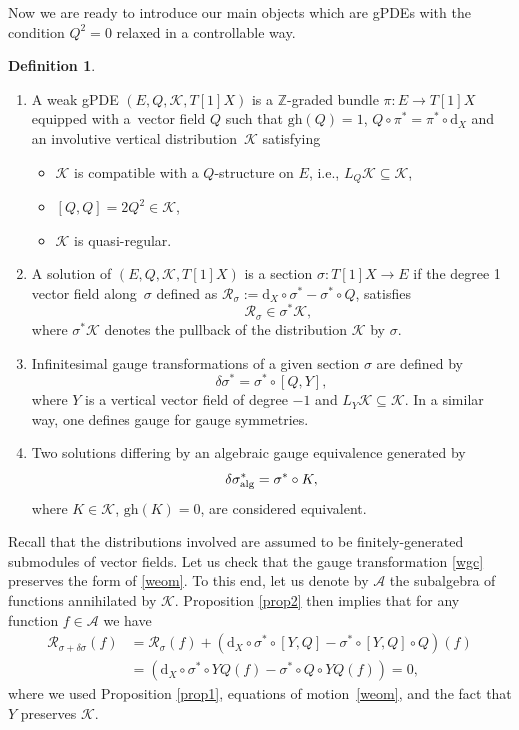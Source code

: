 \documentclass[10pt,a4paper]{amsart}
\numberwithin{equation}{section}
\theoremstyle{definition}
\newtheorem{Definition}[Theorem]{Definition}
\newcommand{\gh}[1]{\mathrm{gh}(#1)}
\newcommand{\dx}{\mathrm{d}_X}
\def\cK{\mathcal{K}}
\begin{document}
Now we are ready to introduce our main objects which are gPDEs with the condition $Q^2=0$ relaxed in a controllable way.
\begin{Definition}\label{def:WGPDE}
\quad
\begin{enumerate}\itemsep=0pt
 \item A weak gPDE $(E,Q,\cK,T[1]X)$ is a $\mathbb{Z}$-graded bundle $\pi\colon E\rightarrow T[1]X$ equipped with a~vector field $Q$ such that $\gh Q=1$, $Q\circ\pi^*=\pi^*\circ \dx$ and an involutive vertical distribution~$\mathcal{K}$ satisfying
 \begin{itemize}\itemsep=0pt
 \item $\mathcal{K}$ is compatible with a $Q$-structure on $E$, i.e., $L_Q \mathcal{K}\subseteq\mathcal{K}$,
 \item $[Q,Q]=2Q^2\in \mathcal{K}$,
 \item $\mathcal{K}$ is quasi-regular.
 \end{itemize}
\item A solution of $(E,Q,\cK,T[1]X)$ is a section $\sigma\colon T[1]X\rightarrow E$ if the degree 1 vector field along~$\sigma$ defined as $\mathcal{R}_{\sigma}:=\dx\circ \sigma^*-\sigma^*\circ Q$, satisfies
\begin{equation}\label{weom}
\quad \mathcal{R}_{\sigma}\in\sigma^*\mathcal{K},
\end{equation}
where $\sigma^*\mathcal{K}$ denotes the pullback of the distribution $\mathcal{K}$ by $\sigma$.
\item Infinitesimal gauge transformations of a given section $\sigma$ are defined by
\begin{equation}\label{wgc}
 \delta\sigma^*=\sigma^*\circ [Q,Y],
\end{equation}
 where $Y$ is a vertical vector field of degree $-1$ and $L_Y\mathcal{K}\subseteq\mathcal{K}$. In a similar way, one defines gauge for gauge symmetries.
 \item Two solutions differing by an algebraic gauge equivalence generated by{\samepage
 \begin{equation*}
 \delta\sigma^*_{\rm alg}=\sigma^*\circ K,
 \end{equation*}
where $K\in \mathcal{K}$, $\gh{K}=0$, are considered equivalent.}
\end{enumerate}
\end{Definition}
Recall that the distributions involved are assumed to be finitely-generated submodules of vector fields. Let us check that the gauge transformation \eqref{wgc} preserves the form of \eqref{weom}. To this end, let us denote by $\mathcal{A}$ the subalgebra of functions annihilated by $\mathcal{K}$. Proposition \ref{prop2} then implies that for any function $f\in\mathcal{A}$ we have
\begin{align*}
\mathcal{R}_{\sigma+\delta\sigma}(f)&{}=\mathcal{R}_{\sigma}(f)+(\dx\circ\sigma^*\circ[Y,Q]-\sigma^*\circ[Y,Q]\circ Q)(f)\\
&{}=(\dx\circ\sigma^*\circ YQ(f)-\sigma^*\circ Q\circ YQ(f))=0,
\end{align*}
where we used Proposition \ref{prop1}, equations of motion~\ref{weom}, and the fact that $Y$ preserves $\mathcal{K}$.
\end{document}
